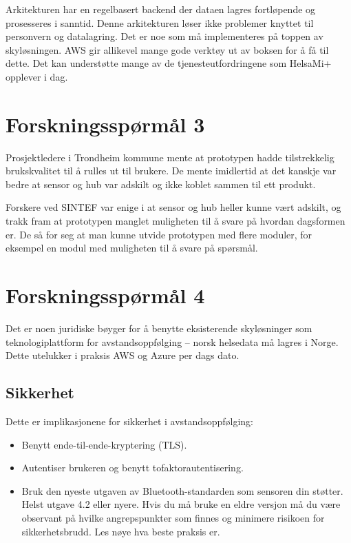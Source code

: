 Arkitekturen har en regelbasert backend der dataen lagres fortløpende og
prosesseres i sanntid. Denne arkitekturen løser ikke problemer knyttet til personvern
og datalagring. Det er noe som må implementeres på toppen av skyløsningen. AWS gir allikevel
mange gode verktøy ut av boksen for å få til dette. Det kan understøtte mange av de
tjenesteutfordringene som HelsaMi+ opplever i dag.

\section{Forskningsspørmål 3}
\textbf{}

Prosjektledere i Trondheim kommune mente at prototypen hadde tilstrekkelig
brukskvalitet til å rulles ut til brukere. De mente imidlertid at det kanskje var bedre at
sensor og hub var adskilt og ikke koblet sammen til ett produkt.

Forskere ved SINTEF var enige i at sensor og hub heller kunne vært adskilt, og trakk
fram at prototypen manglet muligheten til å svare på hvordan
dagsformen er. De så for seg at man kunne utvide prototypen med flere moduler,
for eksempel en modul med muligheten til å svare på spørsmål.

\section{Forskningsspørmål 4}
\textbf{}

Det er noen juridiske bøyger for å benytte eksisterende skyløsninger som teknologiplattform
for avstandsoppfølging -- norsk helsedata må lagres i Norge. Dette utelukker i
praksis AWS og Azure per dags dato.


\subsection{Sikkerhet} %
Dette er implikasjonene for sikkerhet i avstandsoppfølging:

\begin{itemize}
  \item Benytt ende-til-ende-kryptering (TLS).
  \item Autentiser brukeren og benytt tofaktorautentisering.
  \item Bruk den nyeste utgaven av Bluetooth-standarden som sensoren din
  støtter. Helst utgave 4.2 eller nyere. Hvis du må bruke en eldre versjon må
  du være observant på hvilke angrepspunkter som finnes og minimere risikoen for
  sikkerhetsbrudd. Les nøye hva beste praksis er.
\end{itemize}

